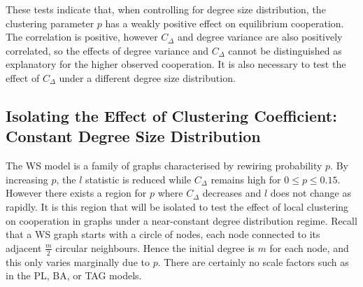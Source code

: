 
These tests indicate that, when controlling for degree size distribution, the clustering parameter $p$ has a weakly positive effect on equilibrium cooperation. The correlation is positive, however $C_\Delta$ and degree variance are also positively correlated, so the effects of degree variance and $C_\Delta$ cannot be distinguished as explanatory for the higher observed cooperation. It is also necessary to test the effect of $C_\Delta$ under a different degree size distribution. \\

\subsection{Isolating the Effect of Clustering Coefficient: Constant Degree Size Distribution}
The WS model is a family of graphs characterised by rewiring probability $p$. By increasing $p$, the $l$ statistic is reduced while $C_\Delta$ remains high for $0\leq p\leq0.15$. However there exists a region for $p$ where $C_\Delta$ decreases and $l$ does not change as rapidly. It is this region that will be isolated to test the effect of local clustering on cooperation in graphs under a near-constant degree distribution regime. Recall that a WS graph starts with a circle of nodes, each node connected to its adjacent $\frac{m}{2}$ circular neighbours. Hence the initial degree is $m$ for each node, and this only varies marginally due to $p$. There are certainly no scale factors such as in the PL, BA, or TAG models. \\


